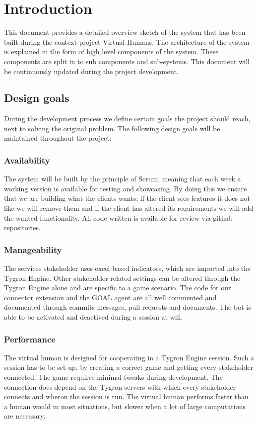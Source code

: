 \section{Introduction}

This document provides a detailed overview sketch of the system that has been built during the context project Virtual Humans. The architecture of the system is explained in the form of high level components of the system. These components are split in to sub components and sub-systems. This document will be continuously updated during the project development.

\subsection{Design goals}
During the development process we define certain goals the project should reach, next to solving the original problem. The following design goals will be maintained throughout the project:

\subsubsection{Availability}
The system will be built by the principle of Scrum, meaning that each week a working version is available for testing and showcasing. By doing this we ensure that we are building what the clients wants; if the client sees features it does not like we will remove them and if the client has altered its requirements we will add the wanted functionality. All code written is available for review via github repositories.

\subsubsection{Manageability}
The services stakeholder uses excel based indicators, which are imported into the Tygron Engine. Other stakeholder related settings can be altered through the Tygron Engine alone and are specific to a game scenario. The code for our connector extension and the GOAL agent are all well commented and documented through commits messages, pull requests and documents. The bot is able to be activated and deactived during a session at will.

\subsubsection{Performance}
The virtual human is designed for cooperating in a Tygron Engine session. Such a session has to be set-up, by creating a correct game and getting every stakeholder connected. The game requires minimal tweaks during development. The connection does depend on the Tygron servers with which every stakeholder connects and wheron the session is run. The virtual human performs faster than a human would in most situations, but slower when a lot of large computations are necessary.

